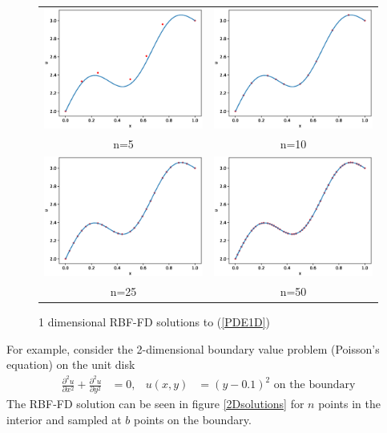 \documentclass[12pt]{article}
\begin{document}
\begin{figure}[ht]
	\caption{1 dimensional RBF-FD solutions to (\ref{PDE1D})}
	\begin{tabular}{cc}
		\includegraphics[width=.4\textwidth]{1D_n5} & \includegraphics[width=.4\textwidth]{1D_n10} \\
		n=5 & n=10 \\
		\includegraphics[width=.4\textwidth]{1D_n25} & \includegraphics[width=.4\textwidth]{1D_n50} \\
		n=25 & n=50
	\end{tabular}
	\label{1Dsolutions}
	\centering
\end{figure}

For example, consider the 2-dimensional boundary value problem (Poisson's equation) on the unit disk
\begin{align}
\frac{\partial ^2u}{\partial x^2} + \frac{\partial ^2u}{\partial y^2} &= 0, & u(x,y)&=(y-0.1)^2 \text{ on the boundary}  \label{PDE2D}
\end{align}
The RBF-FD solution can be seen in figure \ref{2Dsolutions} for $n$ points in the interior and sampled at $b$ points on the boundary.
\end{document}
